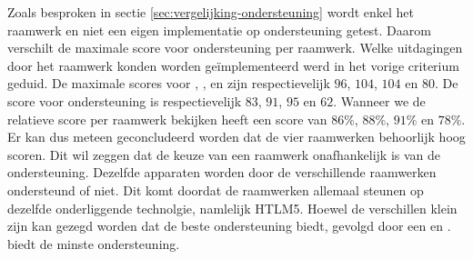 \begin{table}[H]
\centering
{}
\caption{Overzicht van ondersteuning per apparaat.}
\label{tabel:evaluatie-ondersteuning-a}
\end{table}

Zoals besproken in sectie \ref{sec:vergelijking-ondersteuning} wordt enkel het raamwerk en niet een eigen implementatie op ondersteuning getest.
Daarom verschilt de maximale score voor ondersteuning per raamwerk.
Welke uitdagingen door het raamwerk konden worden geïmplementeerd werd in het vorige criterium geduid.
De maximale scores voor \st{},  \kendo{},  \jqm{} en \lungo{} zijn respectievelijk $96$, $104$, $104$ en $80$.
De score voor ondersteuning is respectievelijk $83$, $91$, $95$ en $62$.
Wanneer we de relatieve score per raamwerk bekijken heeft \st{} een score van $86\%$,  \kendo{} $88\%$,  \jqm{} $91\%$ en \lungo $78\%$.
Er kan dus meteen geconcludeerd worden dat de vier raamwerken behoorlijk hoog scoren.
Dit wil zeggen dat de keuze van een raamwerk onafhankelijk is van de ondersteuning.
Dezelfde apparaten worden door de verschillende raamwerken ondersteund of niet.
Dit komt doordat de raamwerken allemaal steunen op dezelfde onderliggende technolgie, namlelijk HTLM5.
Hoewel de verschillen klein zijn kan gezegd worden dat \jqm{} de beste ondersteuning biedt,  gevolgd door een \kendo{} en \st{}.
\lungo{} biedt de minste ondersteuning.

